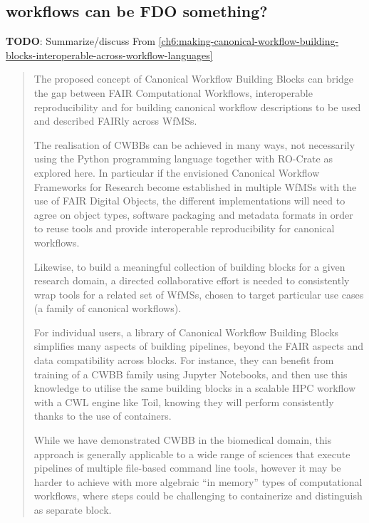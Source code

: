 \subsection{workflows can be FDO something?}

\textbf{TODO}: Summarize/discuss 
From \vref{ch6:making-canonical-workflow-building-blocks-interoperable-across-workflow-languages}

\begin{quotation} 
  The proposed concept of Canonical Workflow Building Blocks can bridge
  the gap between FAIR Computational Workflows, interoperable
  reproducibility and for building canonical workflow descriptions to be
  used and described FAIRly across WfMSs.

  The realisation of CWBBs can be achieved in many ways, not necessarily
  using the Python programming language together with RO-Crate as explored
  here.
  In particular if the envisioned Canonical Workflow Frameworks for
  Research become established in multiple WfMSs with the use of FAIR
  Digital Objects, the different implementations will need to agree on
  object types, software packaging and metadata formats in order to reuse
  tools and provide interoperable reproducibility for canonical workflows.

  Likewise, to build a meaningful collection of building blocks for a
  given research domain, a directed collaborative effort is needed to
  consistently wrap tools for a related set of WfMSs, chosen to target
  particular use cases (a family of canonical workflows).

  For individual users, a library of Canonical Workflow Building Blocks
  simplifies many aspects of building pipelines, beyond the FAIR aspects
  and data compatibility across blocks.
  For instance, they can benefit
  from training of a CWBB family using Jupyter Notebooks, and then use
  this knowledge to utilise the same building blocks in a scalable HPC
  workflow with a CWL engine like Toil, knowing they will perform
  consistently thanks to the use of containers.

  While we have demonstrated CWBB in the biomedical domain, this approach
  is generally applicable to a wide range of sciences that execute
  pipelines of multiple file-based command line tools, however it may be
  harder to achieve with more algebraic ``in memory'' types of
  computational workflows, where steps could be challenging to
  containerize and distinguish as separate block.


\end{quotation}
